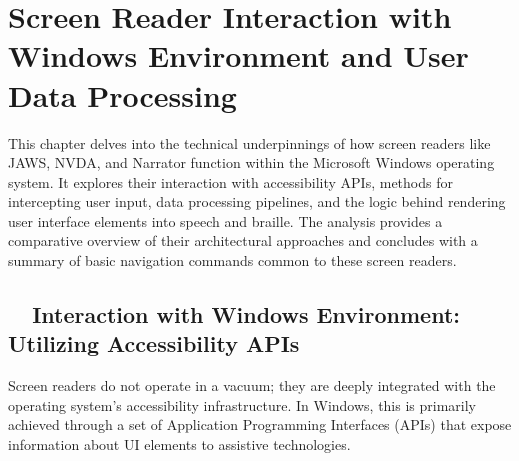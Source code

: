 \chapter{Screen Reader Interaction with Windows Environment and User Data Processing}
\label{cha:screen-reader-interaction-with-windows-environment-and-user-data-processing}

This chapter delves into the technical underpinnings of how screen readers like JAWS, NVDA, and Narrator function within the Microsoft Windows operating system. It explores their interaction with accessibility APIs, methods for intercepting user input, data processing pipelines, and the logic behind rendering user interface elements into speech and braille. The analysis provides a comparative overview of their architectural approaches and concludes with a summary of basic navigation commands common to these screen readers.

\section{~~Interaction with Windows Environment: Utilizing Accessibility APIs}
\label{sec:interaction-with-windows-environment-utilizing-accessibility-apis}

Screen readers do not operate in a vacuum; they are deeply integrated with the operating system's accessibility infrastructure. In Windows, this is primarily achieved through a set of Application Programming Interfaces (APIs) that expose information about UI elements to assistive technologies.

